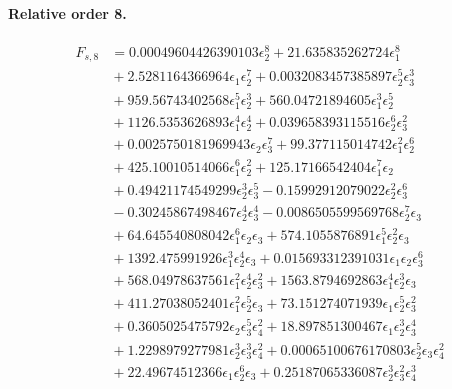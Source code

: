 \documentclass[10pt]{article}
\begin{document}
\paragraph{Relative order 8.}
\begin{align*}
F_{s,8} &= 0.00049604426390103 \epsilon_{2}^{8} + 21.635835262724 \epsilon_{1}^{8} \\
&{}  + 2.5281164366964 \epsilon_{1} \epsilon_{2}^{7} + 0.0032083457385897 \epsilon_{2}^{5} \epsilon_{3}^{3} \\
&{}  + 959.56743402568 \epsilon_{1}^{5} \epsilon_{2}^{3} + 560.04721894605 \epsilon_{1}^{3} \epsilon_{2}^{5} \\
&{}  + 1126.5353626893 \epsilon_{1}^{4} \epsilon_{2}^{4} + 0.039658393115516 \epsilon_{2}^{6} \epsilon_{3}^{2} \\
&{}  + 0.0025750181969943 \epsilon_{2} \epsilon_{3}^{7} + 99.377115014742 \epsilon_{1}^{2} \epsilon_{2}^{6} \\
&{}  + 425.10010514066 \epsilon_{1}^{6} \epsilon_{2}^{2} + 125.17166542404 \epsilon_{1}^{7} \epsilon_{2} \\
&{}  + 0.49421174549299 \epsilon_{2}^{3} \epsilon_{3}^{5} - 0.15992912079022 \epsilon_{2}^{2} \epsilon_{3}^{6} \\
&{}  - 0.30245867498467 \epsilon_{2}^{4} \epsilon_{3}^{4} - 0.0086505599569768 \epsilon_{2}^{7} \epsilon_{3} \\
&{}  + 64.645540808042 \epsilon_{1}^{6} \epsilon_{2} \epsilon_{3} + 574.1055876891 \epsilon_{1}^{5} \epsilon_{2}^{2} \epsilon_{3} \\
&{}  + 1392.475991926 \epsilon_{1}^{3} \epsilon_{2}^{4} \epsilon_{3} + 0.015693312391031 \epsilon_{1} \epsilon_{2} \epsilon_{3}^{6} \\
&{}  + 568.04978637561 \epsilon_{1}^{2} \epsilon_{2}^{4} \epsilon_{3}^{2} + 1563.8794692863 \epsilon_{1}^{4} \epsilon_{2}^{3} \epsilon_{3} \\
&{}  + 411.27038052401 \epsilon_{1}^{2} \epsilon_{2}^{5} \epsilon_{3} + 73.151274071939 \epsilon_{1} \epsilon_{2}^{5} \epsilon_{3}^{2} \\
&{}  + 0.3605025475792 \epsilon_{2} \epsilon_{3}^{5} \epsilon_{4}^{2} + 18.897851300467 \epsilon_{1} \epsilon_{2}^{3} \epsilon_{3}^{4} \\
&{}  + 1.2298979277981 \epsilon_{2}^{3} \epsilon_{3}^{3} \epsilon_{4}^{2} + 0.00065100676170803 \epsilon_{2}^{5} \epsilon_{3} \epsilon_{4}^{2} \\
&{}  + 22.49674512366 \epsilon_{1} \epsilon_{2}^{6} \epsilon_{3} + 0.25187065336087 \epsilon_{2}^{3} \epsilon_{3}^{2} \epsilon_{4}^{3} \\

\end{align*}
\end{document}
